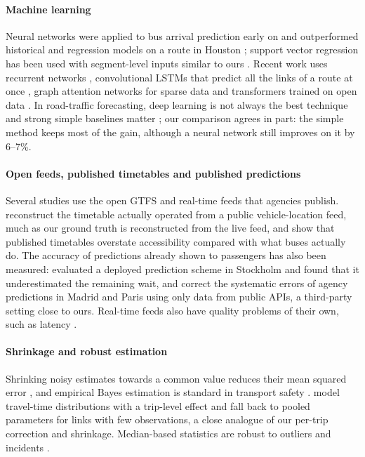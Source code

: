 \paragraph{Machine learning} Neural networks were applied to bus arrival prediction early on \parencite{chien2002} and
outperformed historical and regression models on a route in Houston \parencite{jeong2005}; support vector regression
has been used with segment-level inputs similar to ours \parencite{bin2006svm}. Recent work uses recurrent networks
\parencite{pang2019rnn}, convolutional LSTMs that predict all the links of a route at once
\parencite{petersen2019convlstm}, graph attention networks for sparse data \parencite{ma2022multiattention} and
transformers trained on open data \parencite{jeong2024battransformer}. In road-traffic forecasting, deep learning is
not always the best technique and strong simple baselines matter \parencite{manibardo2022deep}; our comparison agrees
in part: the simple method keeps most of the gain, although a neural network still improves on it by 6--7\%.

\paragraph{Open feeds, published timetables and published predictions} Several studies use the open GTFS and
real-time feeds that agencies publish. \textcite{wessel2017retrospective} reconstruct the timetable actually operated
from a public vehicle-location feed, much as our ground truth is reconstructed from the live feed, and
\textcite{wessel2019accuracy} show that published timetables overstate accessibility compared with what buses actually
do. The accuracy of predictions already shown to passengers has also been measured: \textcite{cats2016realtime}
evaluated a deployed prediction scheme in Stockholm and found that it underestimated the remaining wait, and
\textcite{garciamaurino2024improving} correct the systematic errors of agency predictions in Madrid and Paris using
only data from public APIs, a third-party setting close to ours. Real-time feeds also have quality problems of their
own, such as latency \parencite{zhou2025latency}.

\paragraph{Shrinkage and robust estimation} Shrinking noisy estimates towards a common value reduces their mean squared
error \parencite{jamesstein1961,efronmorris1975}, and empirical Bayes estimation is standard in transport safety
\parencite{hauer2002empirical}. \textcite{woodard2017predicting} model travel-time distributions with a trip-level
effect and fall back to pooled parameters for links with few observations, a close analogue of our per-trip correction
and shrinkage. Median-based statistics are robust to outliers and incidents \parencite{huber1964,clark2002cleaning}.

